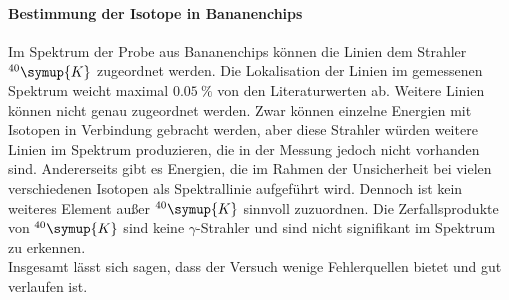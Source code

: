 \paragraph{Bestimmung der Isotope in Bananenchips}
Im Spektrum der Probe aus Bananenchips können die Linien dem Strahler $^{40}\symup{K}$ zugeordnet werden.
Die Lokalisation der Linien im gemessenen Spektrum weicht maximal $\SI{0.05}{\%}$ von den Literaturwerten ab.
Weitere Linien können nicht genau zugeordnet werden.
Zwar können einzelne Energien mit Isotopen in Verbindung gebracht werden, aber diese Strahler würden weitere Linien im Spektrum produzieren, die in der Messung jedoch nicht vorhanden sind.
Andererseits gibt es Energien, die im Rahmen der Unsicherheit bei vielen verschiedenen Isotopen als Spektrallinie aufgeführt wird.
Dennoch ist kein weiteres Element außer $^{40}\symup{K}$ sinnvoll zuzuordnen.
Die Zerfallsprodukte von $^{40}\symup{K}$ sind keine $\gamma$-Strahler und sind nicht signifikant im Spektrum zu erkennen.\\

Insgesamt lässt sich sagen, dass der Versuch wenige Fehlerquellen bietet und gut verlaufen ist.
